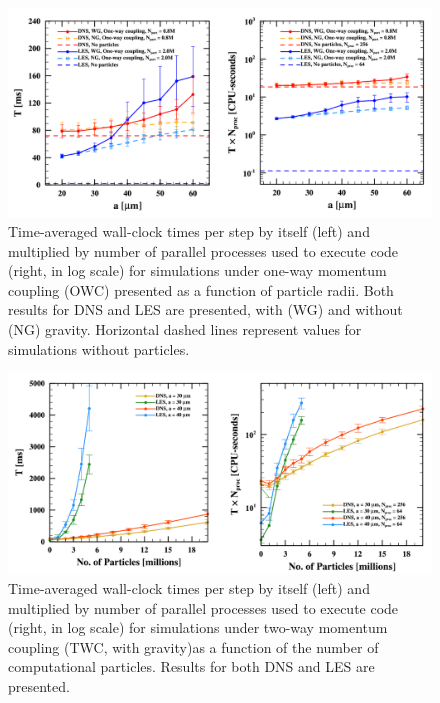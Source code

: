
\begin{figure}
\centering
\includegraphics[width=13.5cm]{figures/3-02_pfsowc.pdf}
\caption{
Time-averaged wall-clock times per step by itself (left) and multiplied by number of parallel processes used to execute code (right, in log scale) for simulations under one-way momentum coupling (OWC) presented as a function of particle radii.
Both results for DNS and LES are presented, with (WG) and without (NG) gravity.
Horizontal dashed lines represent values for simulations without particles.
}
\label{fig:pfsowc}
\end{figure}


\begin{figure}
\centering
\includegraphics[width=13.5cm]{figures/3-03_pfstwc.pdf}
\caption{
Time-averaged wall-clock times per step by itself (left) and multiplied by number of parallel processes used to execute code (right, in log scale) for simulations under two-way momentum coupling (TWC, with gravity)as a function of  the number of computational particles. 
Results for both DNS and LES are presented.
}
\label{fig:pfstwc}
\end{figure}
    
